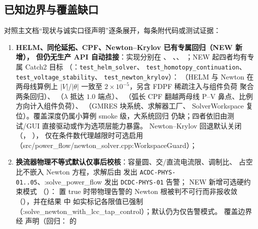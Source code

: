 \subsection{已知边界与覆盖缺口}
对照主文档“现状与诚实口径声明”逐条展开，每条附代码或测试证据：
\begin{enumerate}
  \item \textbf{HELM、同伦延拓、CPF、Newton--Krylov 已有专属回归（NEW 新增），
        但仍无生产 API 自动挂接}：实现分别在
        、
        、、
        ；NEW 起四者均有专属 Catch2 目标
        （：\texttt{test\_helm\_solver}、
        \texttt{test\_homotopy\_continuation}、\texttt{test\_voltage\_stability}、
        \texttt{test\_newton\_krylov}）：
        （HELM 与 Newton 在两母线算例上
        $|V|$/$|\theta|$ 一致至 $2\times10^{-5}$，另含 FDPF 稀疏注入与组件负荷
        聚合两条回归）、
        （$\lambda$ 抵达 $1.0$ 端点）、
        （弧长 CPF 翻越两母线 P--V 鼻点、比例方向计入组件负荷）、
        （GMRES 块系统、求解器工厂、
        SolverWorkspace 复位）。覆盖深度仍属小算例 smoke 级，大系统回归
        仍缺；四者依旧由测试/GUI 直接驱动或作为选项层能力暴露。
        Newton--Krylov 回退默认关闭
        （，
        ），
        仅在条件数代理越限时可选启用（src/power\_flow/newton\_solver.cpp:WorkspaceGuard）；
  \item \textbf{换流器物理不等式默认仅事后校核}：容量圆、交/直流电流限、调制比、
        占空比不嵌入 Newton 方程，求解后由
         发出
        \texttt{ACDC-PHYS-01..05}、:solve\_power\_flow 发出 \texttt{DCDC-PHYS-01} 告警；
        NEW 新增可选硬约束模式
        （）：
        置 true 时带物理告警的 Newton 根被判不可行而非报收敛
        （），并在结果  中
        如实标记各限值已强制（:solve\_newton\_with\_lcc\_tap\_control）；默认仍为仅告警模式。
        覆盖边界经  声明（回归：
         的

\end{enumerate}
